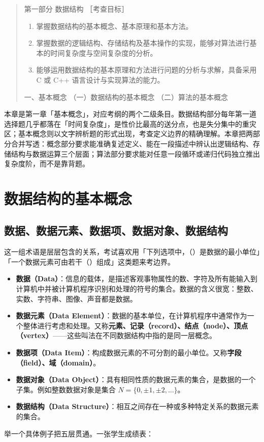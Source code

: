 \documentclass[11pt,openany,UTF8]{ctexbook}
\begin{document}
\begin{quote}
第一部分 数据结构 ［考查目标］

\begin{enumerate}
\item 掌握数据结构的基本概念、基本原理和基本方法。
\item 掌握数据的逻辑结构、存储结构及基本操作的实现，能够对算法进行基本的时间复杂度与空间复杂度的分析。
\item 能够运用数据结构的基本原理和方法进行问题的分析与求解，具备采用 C 或 C++ 语言设计与实现算法的能力。
\end{enumerate}
一、基本概念 （一）数据结构的基本概念 （二）算法的基本概念

\end{quote}
本章是第一章「基本概念」，对应考纲的两个二级条目。数据结构部分每年第一道选择题几乎都落在「时间复杂度」，是性价比最高的送分点，也是失分集中的重灾区；基本概念则以文字辨析题的形式出现，考查定义边界的精确理解。本章把两部分合并写透：概念部分要求能准确复述定义、能在一段描述中辨认出逻辑结构、存储结构与数据运算三个层面；算法部分要求能对任意一段循环或递归代码独立推出复杂度阶，而不是靠背题。

\section{数据结构的基本概念}

\subsection{数据、数据元素、数据项、数据对象、数据结构}

这一组术语是层层包含的关系，考试喜欢用「下列选项中，（）是数据的最小单位」「一个数据元素可由若干（）组成」这类题来考边界。

\begin{itemize}
\item \textbf{数据（Data）}：信息的载体，是描述客观事物属性的数、字符及所有能输入到计算机中并被计算机程序识别和处理的符号的集合。数据的含义很宽：整数、实数、字符串、图像、声音都是数据。
\item \textbf{数据元素（Data Element）}：数据的基本单位，在计算机程序中通常作为一个整体进行考虑和处理。又称\textbf{元素、记录（record）、结点（node）、顶点（vertex）}——这些叫法在不同数据结构中指的是同一层概念。
\item \textbf{数据项（Data Item）}：构成数据元素的不可分割的最小单位。又称\textbf{字段（field）、域（domain）}。
\item \textbf{数据对象（Data Object）}：具有相同性质的数据元素的集合，是数据的一个子集。例如整数数据对象是集合 $N=\{0,\pm1,\pm2,\dots\}$。
\item \textbf{数据结构（Data Structure）}：相互之间存在一种或多种特定关系的数据元素的集合。
\end{itemize}
举一个具体例子把五层贯通。一张学生成绩表：
\end{document}
